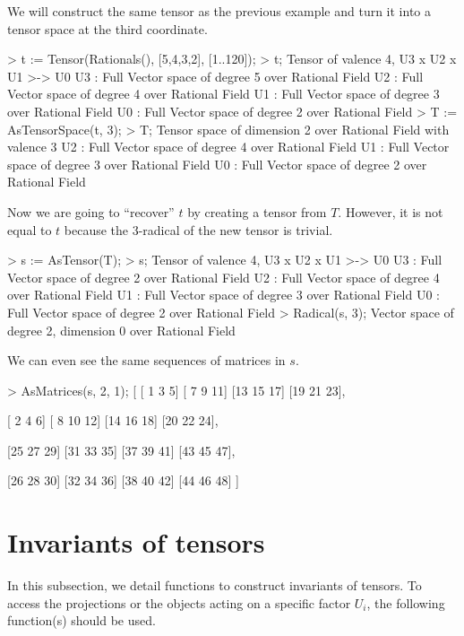 \begin{example}[SpacesToTensors]

We will construct the same tensor as the previous example and turn it into a tensor space at the third coordinate.
\begin{code}
> t := Tensor(Rationals(), [5,4,3,2], [1..120]);
> t;
Tensor of valence 4, U3 x U2 x U1 >-> U0
U3 : Full Vector space of degree 5 over Rational Field
U2 : Full Vector space of degree 4 over Rational Field
U1 : Full Vector space of degree 3 over Rational Field
U0 : Full Vector space of degree 2 over Rational Field
> T := AsTensorSpace(t, 3);
> T;
Tensor space of dimension 2 over Rational Field with valence 3
U2 : Full Vector space of degree 4 over Rational Field
U1 : Full Vector space of degree 3 over Rational Field
U0 : Full Vector space of degree 2 over Rational Field
\end{code}

Now we are going to ``recover'' $t$ by creating a tensor from $T$.
However, it is not equal to $t$ because the 3-radical of the new tensor is trivial.
\begin{code}
> s := AsTensor(T);
> s;
Tensor of valence 4, U3 x U2 x U1 >-> U0
U3 : Full Vector space of degree 2 over Rational Field
U2 : Full Vector space of degree 4 over Rational Field
U1 : Full Vector space of degree 3 over Rational Field
U0 : Full Vector space of degree 2 over Rational Field
> Radical(s, 3);
Vector space of degree 2, dimension 0 over Rational Field
\end{code}

We can even see the same sequences of matrices in $s$.
\begin{code}
> AsMatrices(s, 2, 1);
[
    [ 1  3  5]
    [ 7  9 11]
    [13 15 17]
    [19 21 23],

    [ 2  4  6]
    [ 8 10 12]
    [14 16 18]
    [20 22 24],

    [25 27 29]
    [31 33 35]
    [37 39 41]
    [43 45 47],

    [26 28 30]
    [32 34 36]
    [38 40 42]
    [44 46 48]
]
\end{code}
\end{example}





\section{Invariants of tensors}

In this subsection, we detail functions to construct invariants of tensors.
To access the projections or the objects acting on a specific factor $U_i$, the following function(s) should be used.

